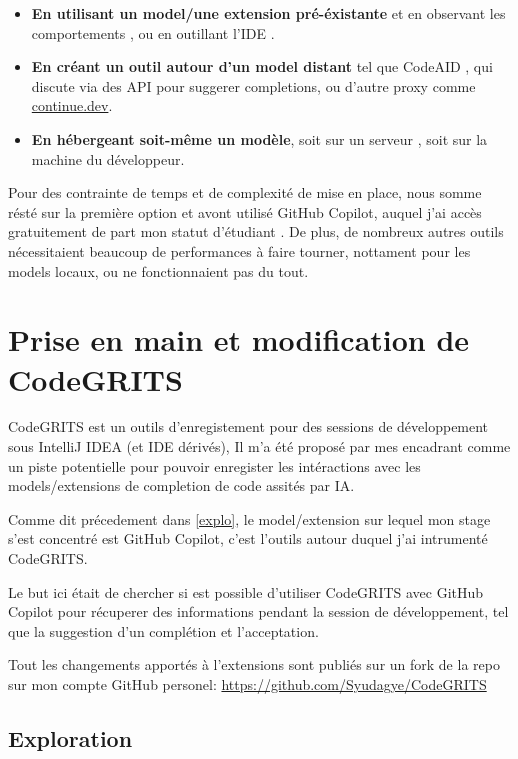 \begin{itemize}
  \item \textbf{En utilisant un model/une extension pré-éxistante} et en observant les comportements \cite{grouded}, ou en outillant l'IDE \cite{productivity-assess}.
  \item \textbf{En créant un outil autour d'un model distant} tel que CodeAID \cite{codeaid}, qui discute via des API pour suggerer completions, ou d'autre proxy comme \href{https://continue.dev}{continue.dev}.
  \item \textbf{En hébergeant soit-même un modèle}, soit sur un serveur \cite{llm-online-offline}, soit sur la machine du développeur.
\end{itemize}

Pour des contrainte de temps et de complexité de mise en place, nous somme résté sur la première option et avont utilisé GitHub Copilot, auquel j'ai accès gratuitement de part mon statut d'étudiant \cite{gh-students}.
De plus, de nombreux autres outils nécessitaient beaucoup de performances à faire tourner, nottament pour les models locaux, ou ne fonctionnaient pas du tout.


\newpage
\section{Prise en main et modification de CodeGRITS}

CodeGRITS est un outils d'enregistement pour des sessions de développement sous IntelliJ IDEA (et IDE dérivés), Il m'a été proposé par mes encadrant comme un
piste potentielle pour pouvoir enregister les intéractions avec les models/extensions de completion de code assités par IA.

Comme dit précedement dans \ref{explo}, le model/extension sur lequel mon stage s'est concentré est GitHub Copilot, c'est l'outils autour duquel j'ai intrumenté CodeGRITS.

Le but ici était de chercher si est possible d'utiliser CodeGRITS avec GitHub Copilot pour récuperer des informations pendant la session de développement, tel que la suggestion d'un complétion et l'acceptation.

Tout les changements apportés à l'extensions sont publiés sur un fork de la repo sur mon compte GitHub personel: \url{https://github.com/Syudagye/CodeGRITS}


\subsection{Exploration}

